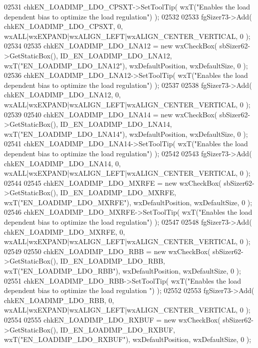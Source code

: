 \begin{DoxyCode}
02531     chkEN_LOADIMP_LDO_CPSXT->SetToolTip( wxT(\textcolor{stringliteral}{"Enables the load dependent bias to optimize the load
       regulation"}) );
02532     
02533     fgSizer73->Add( chkEN_LOADIMP_LDO_CPSXT, 0, wxALL|wxEXPAND|wxALIGN\_LEFT|wxALIGN\_CENTER\_VERTICAL, 0 );
02534     
02535     chkEN_LOADIMP_LDO_LNA12 = \textcolor{keyword}{new} wxCheckBox( sbSizer62->GetStaticBox(), 
      ID_EN_LOADIMP_LDO_LNA12, wxT(\textcolor{stringliteral}{"EN\_LOADIMP\_LDO\_LNA12"}), wxDefaultPosition, wxDefaultSize, 0 );
02536     chkEN_LOADIMP_LDO_LNA12->SetToolTip( wxT(\textcolor{stringliteral}{"Enables the load dependent bias to optimize the load
       regulation"}) );
02537     
02538     fgSizer73->Add( chkEN_LOADIMP_LDO_LNA12, 0, wxALL|wxEXPAND|wxALIGN\_LEFT|wxALIGN\_CENTER\_VERTICAL, 0 );
02539     
02540     chkEN_LOADIMP_LDO_LNA14 = \textcolor{keyword}{new} wxCheckBox( sbSizer62->GetStaticBox(), 
      ID_EN_LOADIMP_LDO_LNA14, wxT(\textcolor{stringliteral}{"EN\_LOADIMP\_LDO\_LNA14"}), wxDefaultPosition, wxDefaultSize, 0 );
02541     chkEN_LOADIMP_LDO_LNA14->SetToolTip( wxT(\textcolor{stringliteral}{"Enables the load dependent bias to optimize the load
       regulation"}) );
02542     
02543     fgSizer73->Add( chkEN_LOADIMP_LDO_LNA14, 0, wxALL|wxEXPAND|wxALIGN\_LEFT|wxALIGN\_CENTER\_VERTICAL, 0 );
02544     
02545     chkEN_LOADIMP_LDO_MXRFE = \textcolor{keyword}{new} wxCheckBox( sbSizer62->GetStaticBox(), 
      ID_EN_LOADIMP_LDO_MXRFE, wxT(\textcolor{stringliteral}{"EN\_LOADIMP\_LDO\_MXRFE"}), wxDefaultPosition, wxDefaultSize, 0 );
02546     chkEN_LOADIMP_LDO_MXRFE->SetToolTip( wxT(\textcolor{stringliteral}{"Enables the load dependent bias to optimize the load
       regulation"}) );
02547     
02548     fgSizer73->Add( chkEN_LOADIMP_LDO_MXRFE, 0, wxALL|wxEXPAND|wxALIGN\_LEFT|wxALIGN\_CENTER\_VERTICAL, 0 );
02549     
02550     chkEN_LOADIMP_LDO_RBB = \textcolor{keyword}{new} wxCheckBox( sbSizer62->GetStaticBox(), 
      ID_EN_LOADIMP_LDO_RBB, wxT(\textcolor{stringliteral}{"EN\_LOADIMP\_LDO\_RBB"}), wxDefaultPosition, wxDefaultSize, 0 );
02551     chkEN_LOADIMP_LDO_RBB->SetToolTip( wxT(\textcolor{stringliteral}{"Enables the load dependent bias to optimize the load regulation
      "}) );
02552     
02553     fgSizer73->Add( chkEN_LOADIMP_LDO_RBB, 0, wxALL|wxEXPAND|wxALIGN\_LEFT|wxALIGN\_CENTER\_VERTICAL, 0 );
02554     
02555     chkEN_LOADIMP_LDO_RXBUF = \textcolor{keyword}{new} wxCheckBox( sbSizer62->GetStaticBox(), 
      ID_EN_LOADIMP_LDO_RXBUF, wxT(\textcolor{stringliteral}{"EN\_LOADIMP\_LDO\_RXBUF"}), wxDefaultPosition, wxDefaultSize, 0 );

\end{DoxyCode}
